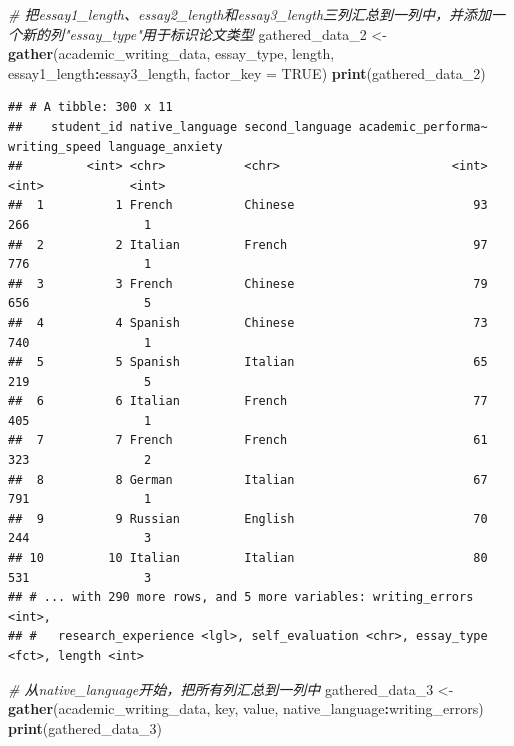 \documentclass[]{book}
\newenvironment{Shaded}{\begin{snugshade}}{\end{snugshade}}
\newcommand{\CommentTok}[1]{\textcolor[rgb]{0.56,0.35,0.01}{\textit{#1}}}
\newcommand{\DataTypeTok}[1]{\textcolor[rgb]{0.13,0.29,0.53}{#1}}
\newcommand{\DecValTok}[1]{\textcolor[rgb]{0.00,0.00,0.81}{#1}}
\newcommand{\KeywordTok}[1]{\textcolor[rgb]{0.13,0.29,0.53}{\textbf{#1}}}
\newcommand{\NormalTok}[1]{#1}
\newcommand{\OperatorTok}[1]{\textcolor[rgb]{0.81,0.36,0.00}{\textbf{#1}}}
\newcommand{\OtherTok}[1]{\textcolor[rgb]{0.56,0.35,0.01}{#1}}
\newcommand{\StringTok}[1]{\textcolor[rgb]{0.31,0.60,0.02}{#1}}
\begin{document}
\begin{Shaded}
\begin{Highlighting}[]
\CommentTok{# 把essay1_length、essay2_length和essay3_length三列汇总到一列中，并添加一个新的列"essay_type"用于标识论文类型}
\NormalTok{gathered_data_}\DecValTok{2}\NormalTok{ <-}\StringTok{ }\KeywordTok{gather}\NormalTok{(academic_writing_data, essay_type, length, essay1_length}\OperatorTok{:}\NormalTok{essay3_length, }\DataTypeTok{factor_key =} \OtherTok{TRUE}\NormalTok{)}
\KeywordTok{print}\NormalTok{(gathered_data_}\DecValTok{2}\NormalTok{)}
\end{Highlighting}
\end{Shaded}

\begin{verbatim}
## # A tibble: 300 x 11
##    student_id native_language second_language academic_performa~ writing_speed language_anxiety
##         <int> <chr>           <chr>                        <int>         <int>            <int>
##  1          1 French          Chinese                         93           266                1
##  2          2 Italian         French                          97           776                1
##  3          3 French          Chinese                         79           656                5
##  4          4 Spanish         Chinese                         73           740                1
##  5          5 Spanish         Italian                         65           219                5
##  6          6 Italian         French                          77           405                1
##  7          7 French          French                          61           323                2
##  8          8 German          Italian                         67           791                1
##  9          9 Russian         English                         70           244                3
## 10         10 Italian         Italian                         80           531                3
## # ... with 290 more rows, and 5 more variables: writing_errors <int>,
## #   research_experience <lgl>, self_evaluation <chr>, essay_type <fct>, length <int>
\end{verbatim}

\begin{Shaded}
\begin{Highlighting}[]
\CommentTok{# 从native_language开始，把所有列汇总到一列中}
\NormalTok{gathered_data_}\DecValTok{3}\NormalTok{ <-}\StringTok{ }\KeywordTok{gather}\NormalTok{(academic_writing_data, key, value, native_language}\OperatorTok{:}\NormalTok{writing_errors)}
\KeywordTok{print}\NormalTok{(gathered_data_}\DecValTok{3}\NormalTok{)}
\end{Highlighting}
\end{Shaded}
\end{document}
